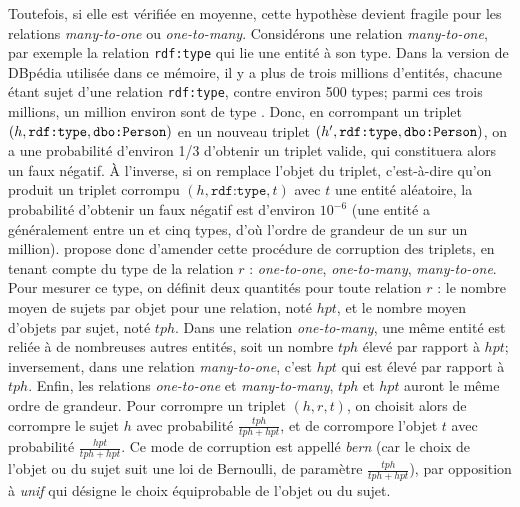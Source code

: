 Toutefois, si elle est vérifiée en moyenne, cette hypothèse devient fragile pour les relations \textit{many-to-one} ou \textit{one-to-many}. Considérons une relation \textit{many-to-one}, par exemple la relation \texttt{rdf:type} qui lie une entité à son type. Dans la version de DBpédia utilisée dans ce mémoire, il y a plus de trois millions d'entités, chacune étant sujet d'une relation \texttt{rdf:type}, contre environ 500 types; parmi ces trois millions, un million environ sont de type . Donc, en corrompant un triplet $(h, \texttt{rdf:type}, \texttt{dbo:Person})$ en un nouveau triplet $(h', \texttt{rdf:type}, \texttt{dbo:Person})$, on a une probabilité d'environ 1/3 d'obtenir un triplet valide, qui constituera alors un faux négatif. À l'inverse, si on remplace l'objet du triplet, c'est-à-dire qu'on produit un triplet corrompu  $(h, \texttt{rdf:type}, t)$ avec $t$ une entité aléatoire, la probabilité d'obtenir un faux négatif est d'environ $10^{-6}$ (une entité a généralement entre un et cinq types, d'où l'ordre de grandeur de un sur un million).
\cite{transh} propose donc d'amender cette procédure de corruption des triplets, en tenant compte du type de la relation $r$ : \textit{one-to-one}, \textit{one-to-many}, \textit{many-to-one}. Pour mesurer ce type, on définit deux quantités pour toute relation $r$ : le nombre moyen de sujets par objet pour une relation, noté $hpt$, et le nombre moyen d'objets par sujet, noté $tph$. Dans une relation \textit{one-to-many}, une même entité est reliée à de nombreuses autres entités, soit un nombre $tph$ élevé par rapport à $hpt$; inversement, dans une relation \textit{many-to-one}, c'est $hpt$ qui est élevé par rapport à $tph$. Enfin, les relations \textit{one-to-one} et \textit{many-to-many}, $tph$ et $hpt$ auront le même ordre de grandeur. Pour corrompre un triplet $(h, r, t)$, on choisit alors de corrompre le sujet $h$ avec probabilité $\frac{tph}{tph + hpt}$, et de corrompore l'objet $t$ avec probabilité $\frac{hpt}{tph + hpt}$. Ce mode de corruption est appellé \textit{bern} (car le choix de l'objet ou du sujet suit une loi de Bernoulli, de paramètre $\frac{tph}{tph + hpt}$), par opposition à \textit{unif} qui désigne le choix équiprobable de l'objet ou du sujet.










